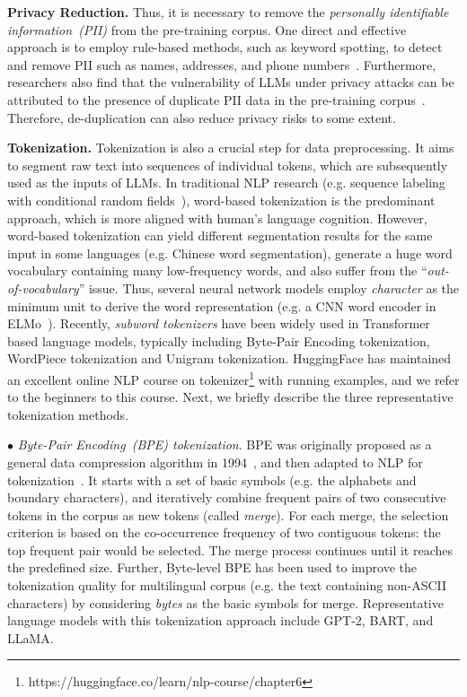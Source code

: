 \textbf{Privacy Reduction.} Thus, it is necessary to remove the \emph{personally identifiable information~(PII)}  from the pre-training corpus. One direct and effective approach is to employ rule-based methods, such as keyword spotting, to detect and remove PII such as names, addresses, and phone numbers~\cite{Laurencon-NIPS-2022-The}. Furthermore, researchers also find that the vulnerability of LLMs under privacy attacks can be attributed to the presence of {duplicate PII data} in the pre-training corpus~\cite{Kandpal-ICML-2022-Deduplicating}. Therefore, de-duplication can also reduce privacy risks to some extent.

\textbf{Tokenization.}
Tokenization is also a crucial step for data preprocessing. It aims to segment raw text into sequences of individual tokens, which are subsequently used as the inputs of LLMs. In traditional NLP research (e.g. sequence labeling with conditional random fields~\cite{Lafferty-ICML-2001}), word-based tokenization is the predominant approach, which is more aligned with human's language cognition. However, word-based tokenization can yield different segmentation results for the same input in some languages (e.g. Chinese word segmentation), generate  a huge word vocabulary containing many low-frequency words, and also suffer from the ``\emph{out-of-vocabulary}'' issue. Thus, several  neural network models employ \emph{character} as the minimum unit to derive the word representation (e.g. a CNN word encoder in ELMo~\cite{Peters-NAACL-2018}). Recently, \emph{subword tokenizers} have been widely used in Transformer based language models, typically including Byte-Pair Encoding tokenization, WordPiece   tokenization and Unigram tokenization. HuggingFace has maintained an excellent online NLP course  on tokenizer\footnote{https://huggingface.co/learn/nlp-course/chapter6} with running examples, and we refer to the beginners to this course. Next, we briefly describe the three representative  tokenization methods. 

$\bullet$ \emph{Byte-Pair Encoding~(BPE) tokenization}. BPE was originally proposed as a general data compression algorithm in 1994~\cite{Philip-1994-BPE}, and then adapted to NLP for tokenization~\cite{Sennrich-ACL-2016-nueral}. It starts with a set of basic symbols (e.g. the alphabets and boundary characters), and iteratively combine frequent pairs of two consecutive tokens in the corpus as new tokens (called \emph{merge}). For each merge, the selection criterion is based on the co-occurrence frequency of two   contiguous tokens: the top frequent pair would be selected. The merge process continues until it reaches the predefined size. Further, Byte-level BPE has been used  to improve the tokenization quality for multilingual corpus (e.g. the text containing non-ASCII characters) by considering \emph{bytes} as the basic symbols for merge. Representative language models with this tokenization approach include GPT-2, BART, and LLaMA. 

